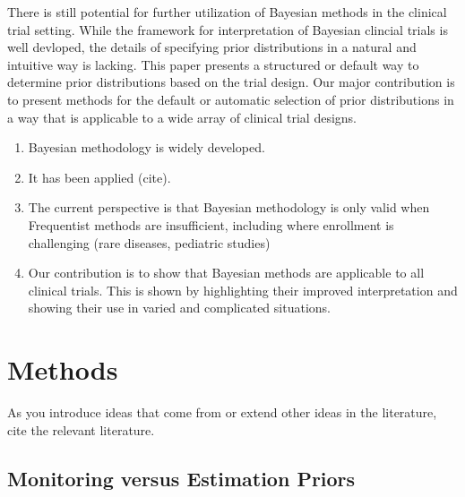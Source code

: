 \documentclass[12pt]{article}
\begin{document}
There is still potential for further utilization of Bayesian methods in the clinical trial setting. While the framework for interpretation of Bayesian clincial trials is well devloped, the details of specifying prior distributions in a natural and intuitive way is lacking. This paper presents a structured or default way to determine prior distributions based on the trial design. Our major contribution is to present methods for the default or automatic selection of prior distributions in a way that is applicable to a wide array of clinical trial designs.

\begin{enumerate}
\item Bayesian methodology is widely developed.
\item It has been applied (cite).
\item The current perspective is that Bayesian methodology is only valid when Frequentist methods are insufficient, including where enrollment is challenging (rare diseases, pediatric studies)
\item Our contribution is to show that Bayesian methods are applicable to all clinical trials. This is shown by highlighting their improved interpretation and showing their use in varied and complicated situations.
\end{enumerate}

\section{Methods}

As you introduce ideas that come from or extend other ideas in the literature, cite the relevant literature.

\subsection{Monitoring versus Estimation Priors}

\end{document}
